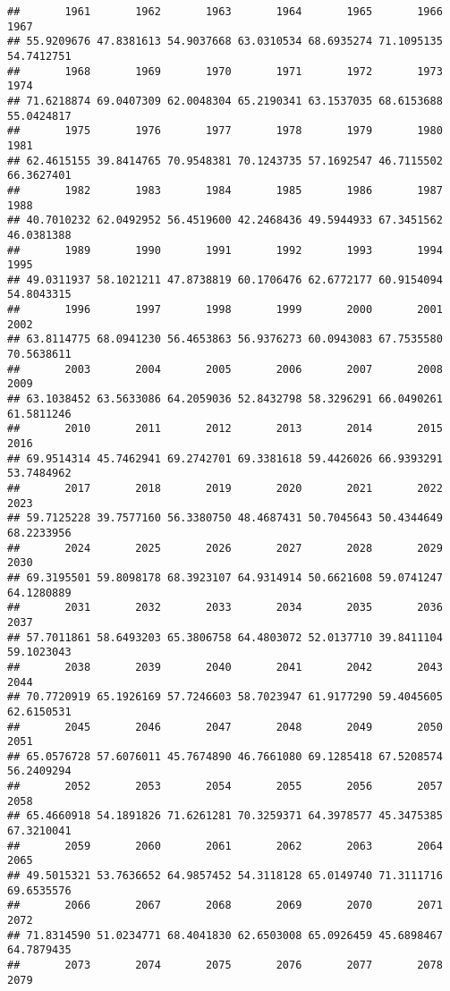 \documentclass[
]{article}
\begin{document}
\begin{verbatim}
##       1961       1962       1963       1964       1965       1966       1967 
## 55.9209676 47.8381613 54.9037668 63.0310534 68.6935274 71.1095135 54.7412751 
##       1968       1969       1970       1971       1972       1973       1974 
## 71.6218874 69.0407309 62.0048304 65.2190341 63.1537035 68.6153688 55.0424817 
##       1975       1976       1977       1978       1979       1980       1981 
## 62.4615155 39.8414765 70.9548381 70.1243735 57.1692547 46.7115502 66.3627401 
##       1982       1983       1984       1985       1986       1987       1988 
## 40.7010232 62.0492952 56.4519600 42.2468436 49.5944933 67.3451562 46.0381388 
##       1989       1990       1991       1992       1993       1994       1995 
## 49.0311937 58.1021211 47.8738819 60.1706476 62.6772177 60.9154094 54.8043315 
##       1996       1997       1998       1999       2000       2001       2002 
## 63.8114775 68.0941230 56.4653863 56.9376273 60.0943083 67.7535580 70.5638611 
##       2003       2004       2005       2006       2007       2008       2009 
## 63.1038452 63.5633086 64.2059036 52.8432798 58.3296291 66.0490261 61.5811246 
##       2010       2011       2012       2013       2014       2015       2016 
## 69.9514314 45.7462941 69.2742701 69.3381618 59.4426026 66.9393291 53.7484962 
##       2017       2018       2019       2020       2021       2022       2023 
## 59.7125228 39.7577160 56.3380750 48.4687431 50.7045643 50.4344649 68.2233956 
##       2024       2025       2026       2027       2028       2029       2030 
## 69.3195501 59.8098178 68.3923107 64.9314914 50.6621608 59.0741247 64.1280889 
##       2031       2032       2033       2034       2035       2036       2037 
## 57.7011861 58.6493203 65.3806758 64.4803072 52.0137710 39.8411104 59.1023043 
##       2038       2039       2040       2041       2042       2043       2044 
## 70.7720919 65.1926169 57.7246603 58.7023947 61.9177290 59.4045605 62.6150531 
##       2045       2046       2047       2048       2049       2050       2051 
## 65.0576728 57.6076011 45.7674890 46.7661080 69.1285418 67.5208574 56.2409294 
##       2052       2053       2054       2055       2056       2057       2058 
## 65.4660918 54.1891826 71.6261281 70.3259371 64.3978577 45.3475385 67.3210041 
##       2059       2060       2061       2062       2063       2064       2065 
## 49.5015321 53.7636652 64.9857452 54.3118128 65.0149740 71.3111716 69.6535576 
##       2066       2067       2068       2069       2070       2071       2072 
## 71.8314590 51.0234771 68.4041830 62.6503008 65.0926459 45.6898467 64.7879435 
##       2073       2074       2075       2076       2077       2078       2079 

\end{verbatim}
\end{document}
